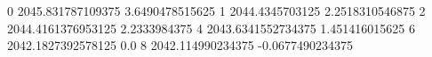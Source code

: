 0 2045.831787109375 3.6490478515625
1 2044.4345703125 2.2518310546875
2 2044.4161376953125 2.2333984375
4 2043.6341552734375 1.451416015625
6 2042.1827392578125 0.0
8 2042.114990234375 -0.0677490234375
